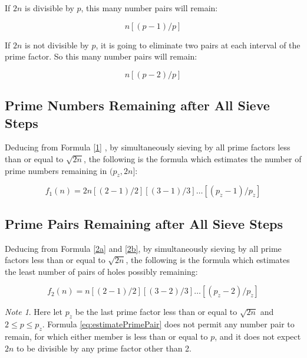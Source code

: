 \documentclass[twocolumn]{article}%
\theoremstyle{definition}
\theoremstyle{remark}
\newtheorem*{note}{Note}
\begin{document}
If $2n$ is divisible by $p$, this many number pairs will remain:

\begin{equation}\label{2a}
n [(p-1)/p]\tag{2a}
\end{equation}

If $2n$ is not divisible by $p$, it is going to eliminate two pairs at each interval of the prime factor. So this many number pairs will remain:

\begin{equation}\label{2b}
n [(p-2)/p]\tag{2b}
\end{equation}
\setcounter{equation}{2}

\subsection*{Prime Numbers Remaining after All Sieve Steps}
Deducing from Formula \eqref{1} , by simultaneously sieving by all prime factors less than or equal to \(\sqrt{2n}\), the following is the formula which estimates the number of prime numbers remaining in $(p_{\dot{z}}, 2n]$:

\begin{equation}\label{eq:estimatePrimeNumber}
f_1(n)=2n[(2-1)/2][(3-1)/3]\dots[(p_{\dot{z}}-1)/p_{\dot{z}}] %
\end{equation}

\subsection*{Prime Pairs Remaining after All Sieve Steps}

Deducing from Formula \eqref{2a} and \eqref{2b}, by simultaneously sieving by all prime factors less than or equal to \(\sqrt{2n}\), the following is the formula which estimates the least number of pairs of holes possibly remaining:

\begin{equation}\label{eq:estimatePrimePair}
f_2(n)=n[(2-1)/2][(3-2)/3]\dots[(p_{\dot{z}}-2)/p_{\dot{z}}]
\end{equation}

\begin{note}
Here let $p_{\dot{z}}$ be the last prime factor less than or equal to \(\sqrt{2n}\) and $2 \le p \le p_{\dot{z}}$. 
Formula \eqref{eq:estimatePrimePair} does not permit any number pair to remain, for which either member is less than or equal to $p$, and it does not expect $2n$ to be divisible by any prime factor other than 2.
\end{note}
\end{document}
